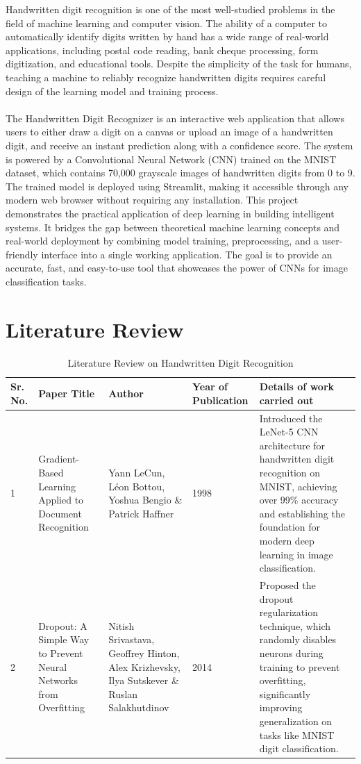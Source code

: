 \documentclass[12pt,a4paper]{report}
\begin{document}
Handwritten digit recognition is one of the most well-studied problems in the field of machine learning and computer vision. The ability of a computer to automatically identify digits written by hand has a wide range of real-world applications, including postal code reading, bank cheque processing, form digitization, and educational tools. Despite the simplicity of the task for humans, teaching a machine to reliably recognize handwritten digits requires careful design of the learning model and training process.\\ \\
The Handwritten Digit Recognizer is an interactive web application that allows users to either draw a digit on a canvas or upload an image of a handwritten digit, and receive an instant prediction along with a confidence score. The system is powered by a Convolutional Neural Network (CNN) trained on the MNIST dataset, which contains 70,000 grayscale images of handwritten digits from 0 to 9. The trained model is deployed using Streamlit, making it accessible through any modern web browser without requiring any installation. This project demonstrates the practical application of deep learning in building intelligent systems. It bridges the gap between theoretical machine learning concepts and real-world deployment by combining model training, preprocessing, and a user-friendly interface into a single working application. The goal is to provide an accurate, fast, and easy-to-use tool that showcases the power of CNNs for image classification tasks.

\chapter{Literature Review}

\begin{table}[h!]
\centering
\caption{Literature Review on Handwritten Digit Recognition}
\begin{tabular}{|p{1cm}|p{3cm}|p{4cm}|p{3cm}|p{4cm}|}
\hline
\textbf{Sr. No.} & \textbf{Paper Title} & \textbf{Author} & \textbf{Year of Publication} & \textbf{Details of work carried out} \\
\hline

1 & Gradient-Based Learning Applied to Document Recognition &
Yann LeCun, Léon Bottou, Yoshua Bengio \& Patrick Haffner & 1998 & Introduced the LeNet-5 CNN architecture for handwritten digit recognition on MNIST, achieving over 99\% accuracy and establishing the foundation for modern deep learning in image classification. \\
\hline

2 & Dropout: A Simple Way to Prevent Neural Networks from Overfitting &
Nitish Srivastava, Geoffrey Hinton, Alex Krizhevsky, Ilya Sutskever \& Ruslan Salakhutdinov & 2014 & Proposed the dropout regularization technique, which randomly disables neurons during training to prevent overfitting, significantly improving generalization on tasks like MNIST digit classification. \\
\hline

\end{tabular}
\end{table}
\end{document}
